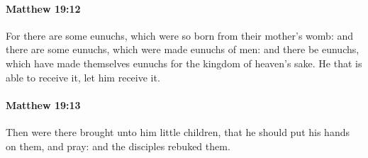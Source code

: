 		\paragraph{Matthew 19:12} %
			\label{MATTHEW-19-12}

			For there are some eunuchs, which were so born from their mother's womb: and there are some eunuchs, which were made eunuchs of men: and there be eunuchs, which have made themselves eunuchs for the kingdom of heaven's sake. He that is able to receive it, let him receive it.

			\begin{framed}
			\scriptsize
				\begin{compactdesc}
					\item[SBLG] 
				\end{compactdesc}
			\end{framed}

		\paragraph{Matthew 19:13} %
			\label{MATTHEW-19-13}

			Then were there brought unto him little children, that he should put his hands on them, and pray: and the disciples rebuked them.

